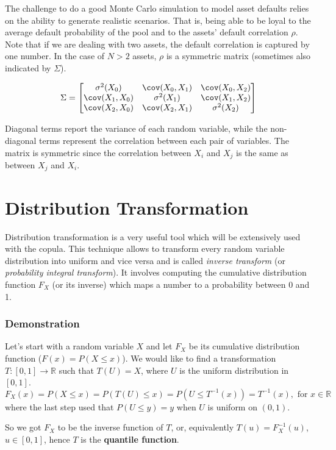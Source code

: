 The challenge to do a good Monte Carlo simulation to model asset defaults relies on the ability to generate realistic scenarios. That is, being able to be loyal to the average default probability of the pool and to the assets’ default correlation $\rho$. Note that if we are dealing with two assets, the default correlation is captured by one number. In the case of $N>2$ assets, $\rho$ is a symmetric matrix (sometimes also indicated by $\Sigma$).

\begin{equation*}
\Sigma = \begin{bmatrix}
\sigma^2 (X_0) & \cov(X_0, X_1) & \cov(X_0, X_2)\\
 \cov(X_1, X_0) & \sigma^2 (X_1) & \cov(X_1, X_2)\\
 \cov(X_2, X_0) & \cov(X_2, X_1) & \sigma^2 (X_2)\\
\end{bmatrix}
\end{equation*}
 
Diagonal terms report the variance of each random variable, while the non-diagonal terms represent the correlation between each pair of variables. The matrix is symmetric since the correlation between $X_i$ and $X_j$ is the same as between $X_j$ and $X_i$.

\section{Distribution Transformation}
\label{distribution-transformation}

Distribution transformation is a very useful tool which will be extensively used with the copula. This technique allows to transform every random variable distribution into uniform and vice versa and is called \emph{inverse transform} (or \emph{probability integral transform}).
It involves computing the cumulative distribution function $F_{X}$ (or its inverse) which maps a number to a probability between 0 and 1. 

\begin{attention}
\subsubsection{Demonstration}
Let's start with a random variable $X$ and let $F_X$ be its cumulative distribution function ($F(x) = P(X \leq x)$).
We would like to find a transformation $T:[0,1]\rightarrow\mathbb{R}$ such that $T(U)=X$, where $U$ is the uniform distribution in $[0,1]$. 
\begin{equation*}
F_X(x)= P(X\leq x)=P(T(U)\leq x)= P(U\leq T^{-1}(x))=T^{-1}(x),{\text{ for }}x\in \mathbb {R}
\end{equation*}
where the last step used that $P(U\leq y)=y$ when $U$ is uniform on $(0,1)$.

So we got $F_{X}$ to be the inverse function of $T$, or, equivalently $T(u)=F_{X}^{-1}(u)$, $u\in [0,1]$, hence $T$ is the \textbf{quantile function}.
\end{attention}

